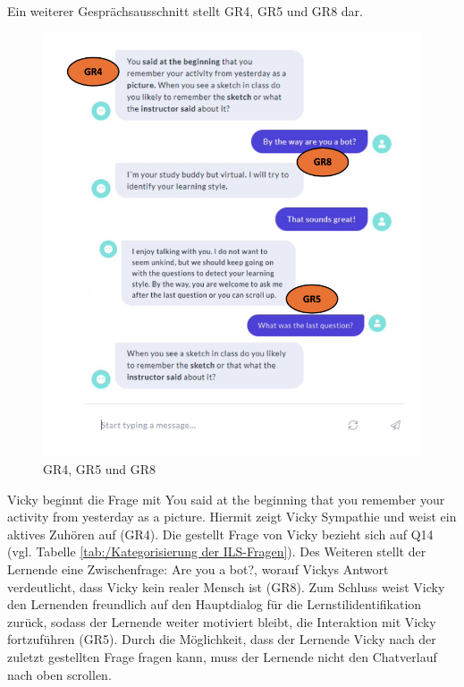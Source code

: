 Ein weiterer Gesprächsausschnitt stellt GR4, GR5 und GR8 dar. 
\begin{figure}[H]
  \centering
  \includegraphics[width=0.7\linewidth]{images/GR4_GR5_GR8.png}
  \caption[GR4, GR5 und GR8]{GR4, GR5 und GR8}
  \label{fig:GR5_GR8_GR4}
\end{figure} 
Vicky beginnt die Frage mit \glqq You said at the beginning that you 
remember your activity from yesterday as a picture.\grqq{}
Hiermit zeigt Vicky Sympathie und  weist ein aktives Zuhören auf (GR4). 
Die gestellt Frage von Vicky bezieht sich auf Q14 (vgl. Tabelle \ref{tab:/Kategorisierung der ILS-Fragen}).
Des Weiteren stellt der Lernende eine Zwischenfrage:
\glqq Are you a bot?\grqq{}, worauf Vickys Antwort verdeutlicht, 
dass Vicky kein realer Mensch ist (GR8). 
Zum Schluss weist Vicky den Lernenden freundlich auf den Hauptdialog
für die Lernstilidentifikation zurück, sodass der 
Lernende weiter motiviert bleibt, die Interaktion mit Vicky
fortzuführen (GR5).
Durch die Möglichkeit, dass der Lernende 
Vicky nach der zuletzt gestellten Frage fragen kann, muss der Lernende 
nicht den Chatverlauf nach oben scrollen.

